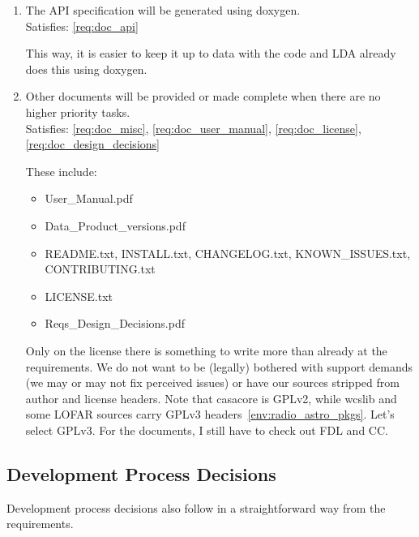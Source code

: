 \documentclass[a4paper,11pt]{article}
\begin{document}
\begin{enumerate}[resume, label=\it D.\arabic{*}]
\item \label{dsg:api_docs} The API specification will be generated using doxygen.\\
Satisfies: \ref{req:doc_api}

This way, it is easier to keep it up to data with the code and LDA already does this using doxygen.

\item \label{dsg:other_docs} Other documents will be provided or made complete when there are no higher priority tasks.\\
Satisfies: \ref{req:doc_misc}, \ref{req:doc_user_manual}, \ref{req:doc_license}, \ref{req:doc_design_decisions}

These include:
\begin{itemize}
\itemsep0em
\item User\_Manual.pdf
\item Data\_Product\_versions.pdf
\item README.txt, INSTALL.txt, CHANGELOG.txt, KNOWN\_ISSUES.txt, CONTRIBUTING.txt
\item LICENSE.txt
\item Reqs\_Design\_Decisions.pdf
\end{itemize}
Only on the license there is something to write more than already at the requirements.
We do not want to be (legally) bothered with support demands (we may or may not fix perceived issues) or have our sources stripped from author and license headers.
Note that casacore is GPLv2, while wcslib and some LOFAR sources carry GPLv3 headers~\ref{env:radio_astro_pkgs}.
Let's select GPLv3.
For the documents, I still have to check out FDL and CC.

\end{enumerate}


\subsection{Development Process Decisions} \label{sec:dev_process_decisions}
Development process decisions also follow in a straightforward way from the requirements.
\end{document}
